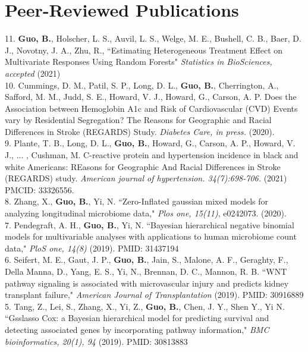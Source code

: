 \section{Peer-Reviewed Publications}

\vspace{-3ex}

11. \textbf{Guo, B.}, Holscher, L. S., Auvil, L. S., Welge, M. E., Bushell, C. B., Baer, D. J., Novotny, J. A., Zhu, R., ``Estimating Heterogeneous Treatment Effect on Multivariate Responses Using Random Forests" \textit{Statistics in BioSciences, accepted} (2021)\\

10. Cummings, D. M., Patil, S. P., Long, D. L., \textbf{Guo, B.}, Cherrington, A., Safford, M. M., Judd, S. E., Howard, V. J., Howard, G., Carson, A. P. Does the Association between Hemoglobin A1c and Risk of Cardiovascular (CVD) Events vary by Residential Segregation? The Reasons for Geographic and Racial Differences in Stroke (REGARDS) Study. \textit{Diabetes Care, in press.} (2020).\\

9. Plante, T. B., Long, D. L., \textbf{Guo, B.}, Howard, G., Carson, A. P., Howard, V. J., ... , Cushman, M. C-reactive protein and hypertension incidence in black and white Americans: REasons for Geographic And Racial Differences in Stroke (REGARDS) study. \textit{American journal of hypertension. 34(7):698-706. } (2021) PMCID: 33326556. \\

8. Zhang, X., \textbf{Guo, B.}, Yi, N. ``Zero-Inflated gaussian mixed models for analyzing longitudinal microbiome data," \textit{Plos one, 15(11)}, e0242073. (2020).\\

7. Pendegraft, A. H., \textbf{Guo, B.}, Yi, N. ``Bayesian hierarchical negative binomial models for multivariable analyses with applications to human microbiome count data," \textit{PloS one, 14(8)} (2019). PMID: 31437194\\

6. Seifert, M. E., Gaut, J. P., \textbf{Guo, B.}, Jain, S., Malone, A. F., Geraghty, F., Della Manna, D., Yang, E. S., Yi, N., Brennan, D. C., Mannon, R. B.  ``WNT pathway signaling is associated with microvascular injury and predicts kidney transplant failure," \textit{American Journal of Transplantation} (2019). PMID: 30916889 \\

5. Tang, Z., Lei, S., Zhang, X., Yi, Z., \textbf{Guo, B.}, Chen, J. Y., Shen Y., Yi N.  ``Gsslasso Cox: a Bayesian hierarchical model for predicting survival and detecting associated genes by incorporating pathway information," \textit{BMC bioinformatics, 20(1), 94} (2019). PMID: 30813883\\

